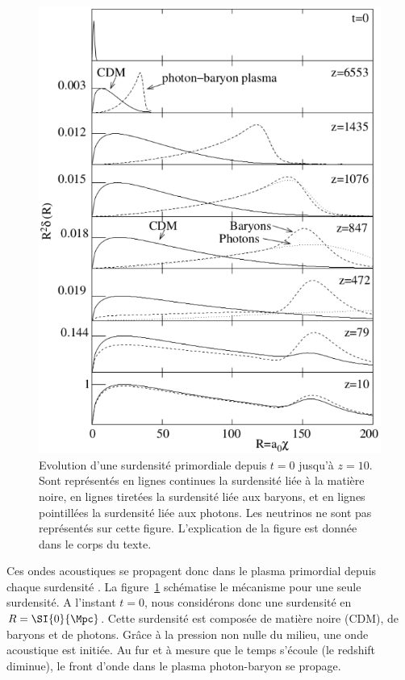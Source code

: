 \begin{figure}
  \centering
  \includegraphics[scale=0.5]{bao_schema}
  \caption{Evolution d'une surdensité primordiale depuis $t=0$ jusqu'à $z=10$. Sont représentés en lignes continues la surdensité liée à la matière noire, en lignes tiretées la surdensité liée aux baryons, et en lignes pointillées la surdensité liée aux photons. Les neutrinos ne sont pas représentés sur cette figure. L'explication de la figure est donnée dans le corps du texte.}
  \label{fig:bao_schema}
\end{figure}
Ces ondes acoustiques se propagent donc dans le plasma primordial depuis chaque surdensité . La figure~\ref{fig:bao_schema} schématise le mécanisme pour une seule surdensité. A l'instant $t=0$, nous considérons donc une surdensité en $R = \SI{0}{\Mpc}$. Cette surdensité est composée de matière noire (CDM), de baryons et de photons.
Grâce à la pression non nulle du milieu, une onde acoustique est initiée. 
Au fur et à mesure que le temps s'écoule (le redshift diminue), le front d'onde dans le plasma photon-baryon se propage.
